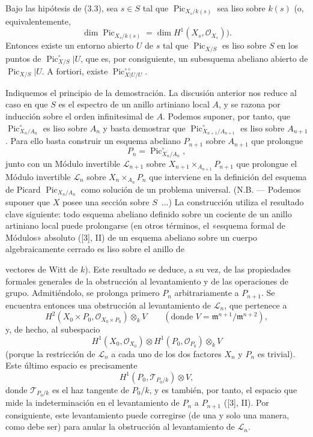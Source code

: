  Bajo las hipótesis de (3.3), sea $s\in S$ tal que
$\operatorname{Pic}_{X_s/k(s)}$ sea liso sobre $k(s)$ (o, equivalentemente,
\[
\dim\operatorname{Pic}_{X_s/k(s)}=\dim H^1(X_s,\mathcal O_{X_s})).
\]
Entonces existe un entorno abierto $U$ de $s$ tal que
$\operatorname{Pic}_{X/S}$ es liso sobre $S$ en los puntos de
$\operatorname{Pic}_{X/S}^\circ|U$, que es, por consiguiente, un subesquema
abeliano abierto de $\operatorname{Pic}_{X/S}|U$. A fortiori, existe
$\operatorname{Pic}_{X|U/U}^{\circ\circ}$.

Indiquemos el principio de la demostración. La discusión anterior nos reduce
al caso en que $S$ es el espectro de un anillo artiniano local $A$, y se razona
por inducción sobre el orden infinitesimal de $A$. Podemos suponer, por tanto,
que $\operatorname{Pic}_{X_n/A_n}^\circ$ es liso sobre $A_n$ y basta demostrar
que $\operatorname{Pic}_{X_{n+1}/A_{n+1}}^\circ$ es liso sobre $A_{n+1}$. Para
ello basta construir un esquema abeliano $P_{n+1}$ sobre $A_{n+1}$ que prolongue
\[
P_n=\operatorname{Pic}_{X_n/A_n}^\circ,
\]
junto con un Módulo invertible $\mathcal L_{n+1}$ sobre
$X_{n+1}\times_{A_{n+1}}P_{n+1}$ que prolongue el Módulo invertible
$\mathcal L_n$ sobre $X_n\times_{A_n}P_n$ que interviene en la definición del
esquema de Picard $\operatorname{Pic}_{X_n/A_n}$ como solución de un problema
universal. (N.B. --- Podemos suponer que $X$ posee una sección sobre $S$~...)
La construcción utiliza el resultado clave siguiente: todo esquema abeliano
definido sobre un cociente de un anillo artiniano local puede prolongarse (en
otros términos, el «esquema formal de Módulos» absoluto ([3], II) de un esquema
abeliano sobre un cuerpo algebraicamente cerrado es liso sobre el anillo de

vectores de Witt de $k$). Este resultado se deduce, a su vez, de las propiedades
formales generales de la obstrucción al levantamiento y de las operaciones de
grupo. Admitiéndolo, se prolonga primero $P_n$ arbitrariamente a $P_{n+1}$. Se
encuentra entonces una obstrucción al levantamiento de $\mathcal L_n$, que
pertenece a
\[
H^2(X_0\times P_0,\mathcal O_{X_0\times P_0})\otimes_k V
\qquad(\text{donde }V=\mathfrak m^{n+1}/\mathfrak m^{n+2}),
\]
y, de hecho, al subespacio
\[
H^1(X_0,\mathcal O_{X_0})\otimes
H^1(P_0,\mathcal O_{P_0})\otimes_k V
\]
(porque la restricción de $\mathcal L_n$ a cada uno de los dos factores $X_n$
y $P_n$ es trivial). Este último espacio es precisamente
\[
H^1(P_0,\mathcal T_{P_0/k})\otimes V,
\]
donde $\mathcal T_{P_0/k}$ es el haz tangente de $P_0/k$, y es también, por
tanto, el espacio que mide la indeterminación en el levantamiento de $P_n$ a
$P_{n+1}$ ([3], II). Por consiguiente, este levantamiento puede corregirse (de
una y solo una manera, como debe ser) para anular la obstrucción al
levantamiento de $\mathcal L_n$.

